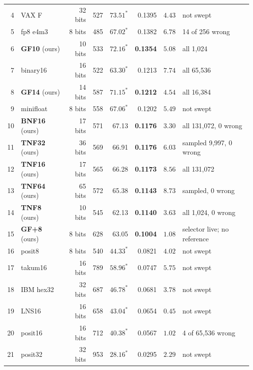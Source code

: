 \documentclass[11pt]{article}
\theoremstyle{definition}
\begin{document}
\begin{table}[t]
\begin{tabular}{rlrrrrrl}
4 & VAX F & 32 bits & 527 & $73.51^{\ast}$ & 0.1395 & $4.43$ & not swept \\
5 & fp8 e4m3 & 8 bits & 485 & $67.02^{\ast}$ & 0.1382 & $6.78$ & 14 of 256 wrong \\
6 & \textbf{GF10} (ours) & 10 bits & 533 & $72.16^{\ast}$ & \textbf{0.1354} & $5.08$ & all 1{,}024 \\
7 & binary16 & 16 bits & 522 & $63.30^{\ast}$ & 0.1213 & $7.74$ & all 65{,}536 \\
8 & \textbf{GF14} (ours) & 14 bits & 587 & $71.15^{\ast}$ & \textbf{0.1212} & $4.54$ & all 16{,}384 \\
9 & minifloat & 8 bits & 558 & $67.06^{\ast}$ & 0.1202 & $5.49$ & not swept \\
10 & \textbf{BNF16} (ours) & 17 bits & 571 & 67.13 & \textbf{0.1176} & $3.30$ & all 131{,}072, 0 wrong \\
11 & \textbf{TNF32} (ours) & 36 bits & 569 & 66.91 & \textbf{0.1176} & $6.03$ & sampled 9{,}997, 0 wrong \\
12 & \textbf{TNF16} (ours) & 17 bits & 565 & 66.28 & \textbf{0.1173} & $8.56$ & all 131{,}072 \\
13 & \textbf{TNF64} (ours) & 65 bits & 572 & 65.38 & \textbf{0.1143} & $8.73$ & sampled, 0 wrong \\
14 & \textbf{TNF8} (ours) & 10 bits & 545 & 62.13 & \textbf{0.1140} & $3.63$ & all 1{,}024, 0 wrong \\
15 & \textbf{GF+8} (ours) & 8 bits & 628 & 63.05 & \textbf{0.1004} & $1.08$ & selector live; no reference \\
16 & posit8 & 8 bits & 540 & $44.33^{\ast}$ & 0.0821 & $4.02$ & not swept \\
17 & takum16 & 16 bits & 789 & $58.96^{\ast}$ & 0.0747 & $5.75$ & not swept \\
18 & IBM hex32 & 32 bits & 687 & $46.78^{\ast}$ & 0.0681 & $3.78$ & not swept \\
19 & LNS16 & 16 bits & 658 & $43.04^{\ast}$ & 0.0654 & $0.45$ & not swept \\
20 & posit16 & 16 bits & 712 & $40.38^{\ast}$ & 0.0567 & $1.02$ & 4 of 65{,}536 wrong \\
21 & posit32 & 32 bits & 953 & $28.16^{\ast}$ & 0.0295 & $2.29$ & not swept \\
\bottomrule
\end{tabular}
\end{table}
\end{document}
